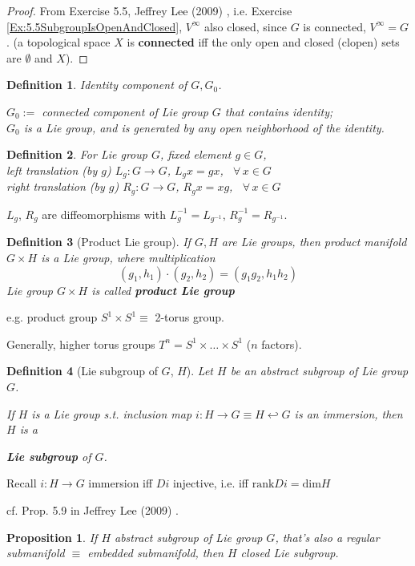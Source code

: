 \documentclass[10pt]{amsart}
\newtheorem{proposition}{Proposition}
\newtheorem{definition}{Definition}
\begin{document}
\begin{multicols*}{2}
\begin{proof}
From Exercise 5.5, Jeffrey Lee (2009) \cite{JLee2009}, i.e. Exercise \ref{Ex:5.5SubgroupIsOpenAndClosed}, $V^{\infty}$ also closed, since $G$ is connected, $V^{\infty} = G$. (a topological space $X$ is \textbf{connected} iff the only open and closed (clopen) sets are $\emptyset$ and $X$).
	
\end{proof}

\begin{definition}
	Identity component of $G, G_0$.  

$G_0 := $ connected component of Lie group $G$ that contains identity; \\
$G_0$ is a Lie group, and is generated by any open neighborhood of the identity.
\end{definition}

\begin{definition}
	For Lie group $G$, fixed element $g\in G$, \\
	left translation (by $g$) $L_g: G \to G$, $L_g x  = gx$, \quad \, $\forall \, x \in G$ \\
	right translation (by $g$) $R_g: G \to G$, $R_g x  = xg$, \quad \, $\forall \, x \in G$ 
\end{definition}

$L_g$, $R_g$ are diffeomorphisms with $L_g^{-1} = L_{g^{-1}}$, $R_g^{-1} = R_{g^{-1}}$.

\begin{definition}[Product Lie group]
	If $G,H$ are Lie groups, then product manifold $G\times H$ is a Lie group, where multiplication
	\[
	(g_1, h_1) \cdot (g_2, h_2) = (g_1g_2, h_1h_2)
	\]
	Lie group $G\times H$ is called \textbf{product Lie group}
\end{definition}
e.g. product group $S^1 \times S^1 \equiv $ 2-torus group.

Generally, higher torus groups $T^n = S^1 \times \dots \times S^1$ ($n$ factors).

\begin{definition}[Lie subgroup of $G$, $H$]
	Let $H$ be an abstract subgroup of Lie group $G$. 
	
	If $H$ is a Lie group s.t. inclusion map $i: H \to G \equiv H \hookleftarrow G$ is an immersion, then $H$ is a 

	\textbf{Lie subgroup} of $G$.
\end{definition}
Recall $i : H \to G$ immersion iff $Di$ injective, i.e.	iff $\text{rank}{Di} = \text{dim}{H}$


cf. Prop. 5.9 in Jeffrey Lee (2009) \cite{JLee2009}.
\begin{proposition}
	If $H$ abstract subgroup of Lie group $G$, that's also a regular submanifold $\equiv$ embedded submanifold, then $H$ closed Lie subgroup.
\end{proposition}


\end{multicols*}
\end{document}
